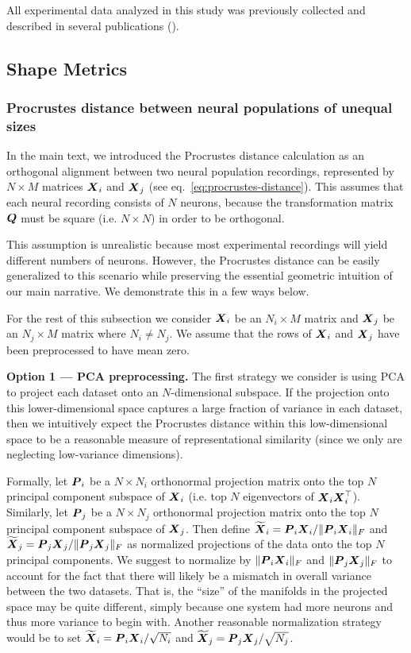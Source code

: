 
All experimental data analyzed in this study was previously collected and described in several publications (\cite{duszkiewicz,Siegle2021-hs, Siegel2015-cz, iblreproducibility}).

\subsection{Shape Metrics}

\subsubsection{Procrustes distance between neural populations of unequal sizes}

In the main text, we introduced the Procrustes distance calculation as an orthogonal alignment between two neural population recordings, represented by $N \times M$ matrices $\boldsymbol{X}_i$ and $\boldsymbol{X}_j$ (see eq.~\ref{eq:procrustes-distance}).
This assumes that each neural recording consists of $N$ neurons, because the transformation matrix $\boldsymbol{Q}$ must be square (i.e. $N \times N$) in order to be orthogonal.

This assumption is unrealistic because most experimental recordings will yield different numbers of neurons.
However, the Procrustes distance can be easily generalized to this scenario while preserving the essential geometric intuition of our main narrative.
We demonstrate this in a few ways below.

For the rest of this subsection we consider $\boldsymbol{X}_i$ be an $N_i \times M$ matrix and $\boldsymbol{X}_j$ be an $N_j \times M$ matrix where $N_i \neq N_j$.
We assume that the rows of $\boldsymbol{X}_i$ and $\boldsymbol{X}_j$ have been preprocessed to have mean zero.

\textbf{Option 1 --- PCA preprocessing.}
The first strategy we consider is using PCA to project each dataset onto an $N$-dimensional subspace.
If the projection onto this lower-dimensional space captures a large fraction of variance in each dataset, then we intuitively expect the Procrustes distance within this low-dimensional space to be a reasonable measure of representational similarity (since we only are neglecting low-variance dimensions).

Formally, let $\boldsymbol{P}_i$ be a $N \times N_i$ orthonormal projection matrix onto the top $N$ principal component subspace of $\boldsymbol{X}_i$ (i.e. top $N$ eigenvectors of $\boldsymbol{X}_i \boldsymbol{X}_i^\top$).
Similarly, let $\boldsymbol{P}_j$ be a $N \times N_j$ orthonormal projection matrix onto the top $N$ principal component subspace of $\boldsymbol{X}_j$.
Then define $\widetilde{\boldsymbol{X}}_i = \boldsymbol{P}_i \boldsymbol{X}_i / \Vert \boldsymbol{P}_i \boldsymbol{X}_i \Vert_F$ and $\widetilde{\boldsymbol{X}}_j = \boldsymbol{P}_j \boldsymbol{X}_j / \Vert \boldsymbol{P}_j \boldsymbol{X}_j \Vert_F$ as normalized projections of the data onto the top $N$ principal components.
We suggest to normalize by $\Vert \boldsymbol{P}_i \boldsymbol{X}_i \Vert_F$ and $\Vert \boldsymbol{P}_j \boldsymbol{X}_j \Vert_F$ to account for the fact that there will likely be a mismatch in overall variance between the two datasets.
That is, the ``size'' of the manifolds in the projected space may be quite different, simply because one system had more neurons and thus more variance to begin with.
Another reasonable normalization strategy would be to set $\widetilde{\boldsymbol{X}}_i = \boldsymbol{P}_i \boldsymbol{X}_i / \sqrt{N_i}$ and $\widetilde{\boldsymbol{X}}_j = \boldsymbol{P}_j \boldsymbol{X}_j / \sqrt{N_j}$.

